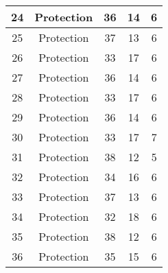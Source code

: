 \documentclass[results.tex]{subfiles}
\begin{document}
\begin{center}
\begin{tabular}{| c || c | c | c | c |}
            \hline
            24                      & Protection                   & 36                     & 14                      & 6                    \\
            \hline
            25                      & Protection                   & 37                     & 13                      & 6                    \\
            \hline
            26                      & Protection                   & 33                     & 17                      & 6                    \\
            \hline
            27                      & Protection                   & 36                     & 14                      & 6                    \\
            \hline
            28                      & Protection                   & 33                     & 17                      & 6                    \\
            \hline
            29                      & Protection                   & 36                     & 14                      & 6                    \\
            \hline
            30                      & Protection                   & 33                     & 17                      & 7                    \\
            \hline
            31                      & Protection                   & 38                     & 12                      & 5                    \\
            \hline
            32                      & Protection                   & 34                     & 16                      & 6                    \\
            \hline
            33                      & Protection                   & 37                     & 13                      & 6                    \\
            \hline
            34                      & Protection                   & 32                     & 18                      & 6                    \\
            \hline
            35                      & Protection                   & 38                     & 12                      & 6                    \\
            \hline
            36                      & Protection                   & 35                     & 15                      & 6                    \\

\end{tabular}
\end{center}
\end{document}
